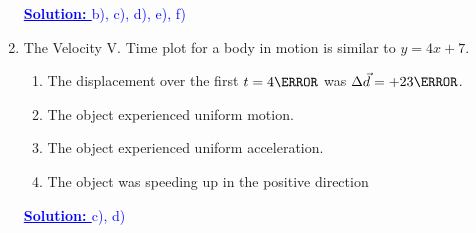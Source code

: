 \documentclass[12pt]{article} %
\begin{document}
\begin{qstn}[2]
\begin{enumerate}
            \textcolor{blue}{\textbf{\underline{Solution: }}b), c), d), e), f)}

        \item The Velocity V. Time plot for a body in motion is similar to $y = 4x + 7$.
            \begin{enumerate}[label = (\alph*)]
                \item The displacement over the first $t = 4\s$ was $\Delta \vec d = +23\m$.
                \item The object experienced uniform motion.
                \item The object experienced uniform acceleration.
                \item The object was speeding up in the positive direction 
            \end{enumerate}
            \textcolor{blue}{\textbf{\underline{Solution: }}c), d)}
        
        \end{enumerate}

    \end{qstn}
\end{document}

